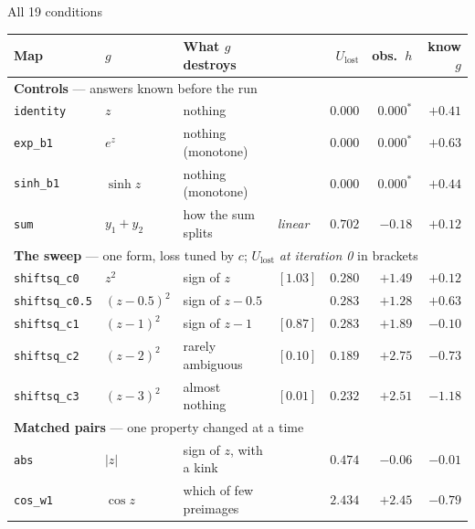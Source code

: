 \documentclass[aspectratio=169,11pt]{beamer}
\newcommand{\Ulost}{U_{\text{lost}}}
\newcommand{\good}{\textcolor{green!50!black}}
\newcommand{\bad}{\textcolor{red!70!black}}
\begin{document}
\begin{frame}[shrink=8]{All 19 conditions}

\begin{center}
\tiny
\setlength{\tabcolsep}{3.5pt}
\renewcommand{\arraystretch}{0.95}
\begin{tabular}{llllrrr}
\toprule
Map & $g$ & What $g$ destroys & & $\Ulost$ & obs.\ $h$ & know $g$ \\
\midrule
\multicolumn{7}{l}{\textbf{Controls} --- answers known before the run}\\
\texttt{identity}   & $z$          & nothing                      &                 & $0.000$ & \good{$0.000^\ast$} & $+0.41$ \\
\texttt{exp\_b1}    & $e^{z}$      & nothing (monotone)           &                 & $0.000$ & \good{$0.000^\ast$} & $+0.63$ \\
\texttt{sinh\_b1}   & $\sinh z$    & nothing (monotone)           &                 & $0.000$ & \good{$0.000^\ast$} & $+0.44$ \\
\texttt{sum}        & $y_1+y_2$    & how the sum splits           & \emph{linear}   & $0.702$ & $-0.18$ & \good{$+0.12$} \\
\midrule
\multicolumn{7}{l}{\textbf{The sweep} --- one form, loss tuned by $c$; $\Ulost$ \emph{at iteration 0} in brackets}\\
\texttt{shiftsq\_c0}   & $z^2$       & sign of $z$     & $[1.03]$ & $0.280$ & \bad{$+1.49$} & $+0.12$ \\
\texttt{shiftsq\_c0.5} & $(z-0.5)^2$ & sign of $z-0.5$ &          & $0.283$ & \bad{$+1.28$} & $+0.63$ \\
\texttt{shiftsq\_c1}   & $(z-1)^2$   & sign of $z-1$   & $[0.87]$ & $0.283$ & \bad{$+1.89$} & $-0.10$ \\
\texttt{shiftsq\_c2}   & $(z-2)^2$   & rarely ambiguous& $[0.10]$ & $0.189$ & \bad{$+2.75$} & $-0.73$ \\
\texttt{shiftsq\_c3}   & $(z-3)^2$   & almost nothing  & $[0.01]$ & $0.232$ & \bad{$+2.51$} & $-1.18$ \\
\midrule
\multicolumn{7}{l}{\textbf{Matched pairs} --- one property changed at a time}\\
\texttt{abs}      & $|z|$                     & sign of $z$, with a kink  &                    & $0.474$ & $-0.06$ & $-0.01$ \\
\texttt{cos\_w1}  & $\cos z$                  & which of few preimages    &                    & $2.434$ & $+2.45$ & $-0.79$ \\

\end{tabular}
\end{center}
\end{frame}
\end{document}
